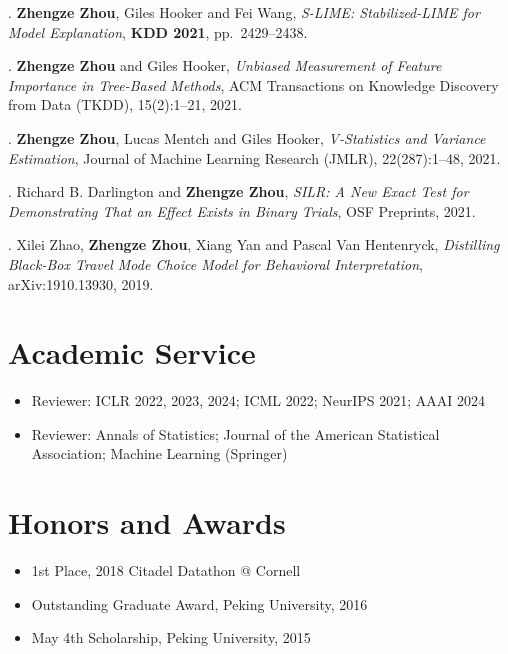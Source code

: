 \documentclass{article}
\begin{document}
. \textbf{Zhengze Zhou}, Giles Hooker and Fei Wang,
\textit{S-LIME: Stabilized-LIME for Model Explanation},
\textbf{KDD 2021}, pp.\ 2429--2438.

. \textbf{Zhengze Zhou} and Giles Hooker,
\textit{Unbiased Measurement of Feature Importance in Tree-Based Methods},
ACM Transactions on Knowledge Discovery from Data (TKDD), 15(2):1--21, 2021.

. \textbf{Zhengze Zhou}, Lucas Mentch and Giles Hooker,
\textit{V-Statistics and Variance Estimation},
Journal of Machine Learning Research (JMLR), 22(287):1--48, 2021.

. Richard B. Darlington and \textbf{Zhengze Zhou},
\textit{SILR: A New Exact Test for Demonstrating That an Effect Exists in Binary Trials},
OSF Preprints, 2021.

. Xilei Zhao, \textbf{Zhengze Zhou}, Xiang Yan and Pascal Van Hentenryck,
\textit{Distilling Black-Box Travel Mode Choice Model for Behavioral Interpretation},
arXiv:1910.13930, 2019.

\section*{Academic Service}

\begin{itemize}
  \item Reviewer: ICLR 2022, 2023, 2024; ICML 2022; NeurIPS 2021; AAAI 2024
  \item Reviewer: Annals of Statistics; Journal of the American Statistical Association;
        Machine Learning (Springer)
\end{itemize}

\section*{Honors and Awards}

\begin{itemize}
  \item 1st Place, 2018 Citadel Datathon @ Cornell
  \item Outstanding Graduate Award, Peking University, 2016
  \item May 4th Scholarship, Peking University, 2015
\end{itemize}
\end{document}
